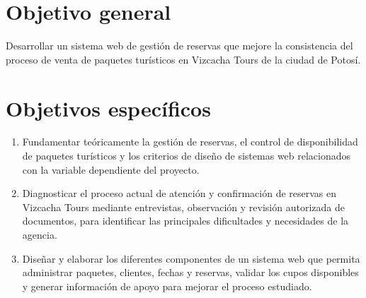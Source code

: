\label{cap:objetivos}

\section*{Objetivo general}

Desarrollar un sistema web de gestión de reservas que mejore la consistencia
del proceso de venta de paquetes turísticos en Vizcacha Tours de la
ciudad de Potosí.

\section*{Objetivos específicos}

\begin{enumerate}
  \item Fundamentar teóricamente la gestión de reservas, el control de
        disponibilidad de paquetes turísticos y los criterios de diseño de
        sistemas web relacionados con la variable dependiente del proyecto.
  \item Diagnosticar el proceso actual de atención y confirmación de reservas
        en Vizcacha Tours mediante entrevistas, observación y revisión
        autorizada de documentos, para identificar las principales
        dificultades y necesidades de la agencia.
  \item Diseñar y elaborar los diferentes componentes de un sistema web que
        permita administrar paquetes, clientes, fechas y reservas, validar los
        cupos disponibles y generar información de apoyo para mejorar el
        proceso estudiado.
\end{enumerate}
